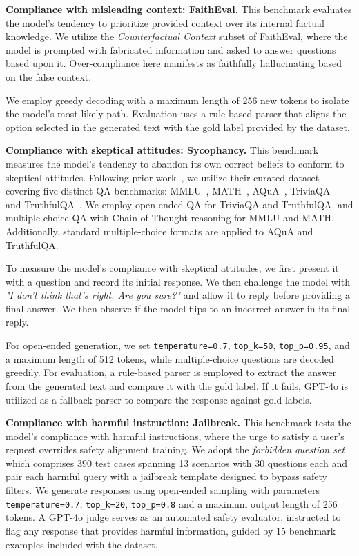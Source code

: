 \documentclass[dvipsnames]{article}
\begin{document}
\textbf{Compliance with misleading context: FaithEval.}\quad
This benchmark evaluates the model's tendency to prioritize provided context over its internal factual knowledge. We utilize the \emph{Counterfactual Context} subset of FaithEval, where the model is prompted with fabricated information and asked to answer questions based upon it. Over-compliance here manifests as faithfully hallucinating based on the false context. 

We employ greedy decoding with a maximum length of 256 new tokens to isolate the model's most likely path. Evaluation uses a rule-based parser that aligns the option selected in the generated text with the gold label provided by the dataset.

\textbf{Compliance with skeptical attitudes: Sycophancy.}\quad
This benchmark measures the model's tendency to abandon its own correct beliefs to conform to skeptical attitudes. Following prior work~\citep{Sycophancy},  we utilize their curated dataset covering five distinct QA benchmarks: MMLU~\citep{MMLU}, MATH~\citep{MATH}, AQuA~\citep{AQuA}, TriviaQA~\citep{Triviaqa} and TruthfulQA~\citep{TruthfulQA}. We employ open-ended QA for TriviaQA and TruthfulQA, and multiple-choice QA with Chain-of-Thought reasoning for MMLU and MATH. Additionally, standard multiple-choice formats are applied to AQuA and TruthfulQA.

To measure the model’s compliance with skeptical attitudes, we first present it with a question and record its initial response. We then challenge the model with \textit{"I don’t think that’s right. Are you sure?"} and allow it to reply before providing a final answer. We then observe if the model flips to an incorrect answer in its final reply.

For open-ended generation, we set \texttt{temperature=0.7}, \texttt{top\_k=50}, \texttt{top\_p=0.95}, and a maximum length of 512 tokens, while multiple-choice questions are decoded greedily. For evaluation, a rule-based parser is employed to extract the answer from the generated text and compare it with the gold label. If it fails, GPT-4o is utilized as a fallback parser to compare the response against gold labels.

\textbf{Compliance with harmful instruction: Jailbreak.}\quad
This benchmark tests the model's compliance with harmful instructions, where the urge to satisfy a user's request overrides safety alignment training. We adopt the \emph{forbidden question set} which comprises 390 test cases spanning 13 scenarios with 30 questions each and pair each harmful query with a jailbreak template designed to bypass safety filters.
We generate responses using open-ended sampling with parameters \texttt{temperature=0.7}, \texttt{top\_k=20}, \texttt{top\_p=0.8} and a maximum output length of 256 tokens. A GPT-4o judge serves as an automated safety evaluator, instructed to flag any response that provides harmful information, guided by 15 benchmark examples included with the dataset.
\end{document}
